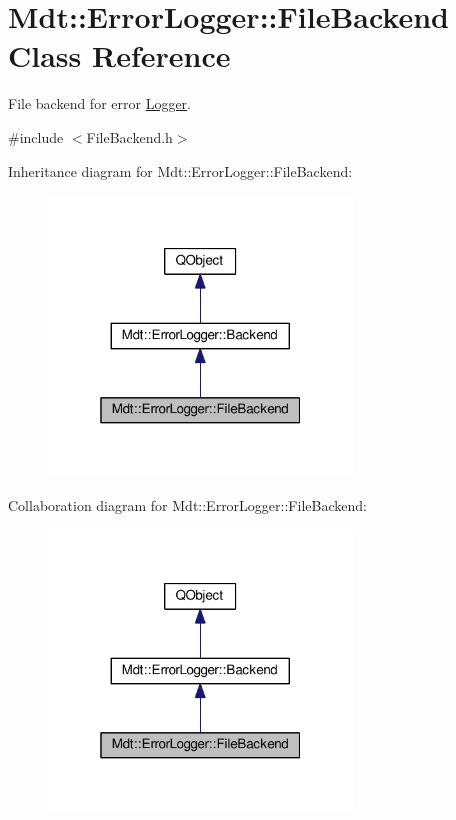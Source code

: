 \hypertarget{class_mdt_1_1_error_logger_1_1_file_backend}{}\section{Mdt\+:\+:Error\+Logger\+:\+:File\+Backend Class Reference}
\label{class_mdt_1_1_error_logger_1_1_file_backend}


File backend for error \hyperlink{class_mdt_1_1_error_logger_1_1_logger}{Logger}.  




{\ttfamily \#include $<$File\+Backend.\+h$>$}



Inheritance diagram for Mdt\+:\+:Error\+Logger\+:\+:File\+Backend\+:
\nopagebreak
\begin{figure}[H]
\begin{center}
\leavevmode
\includegraphics[width=229pt]{class_mdt_1_1_error_logger_1_1_file_backend__inherit__graph}
\end{center}
\end{figure}


Collaboration diagram for Mdt\+:\+:Error\+Logger\+:\+:File\+Backend\+:
\nopagebreak
\begin{figure}[H]
\begin{center}
\leavevmode
\includegraphics[width=229pt]{class_mdt_1_1_error_logger_1_1_file_backend__coll__graph}
\end{center}
\end{figure}

